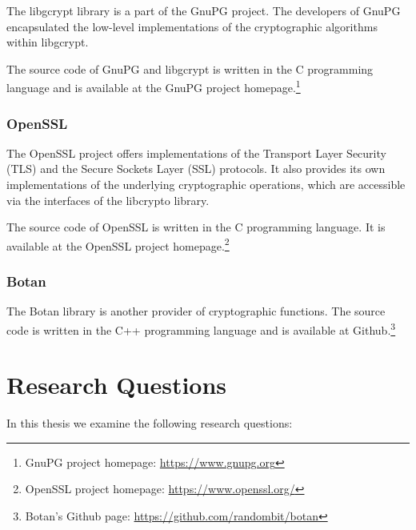 The libgcrypt library is a part of the GnuPG project.
The developers of GnuPG encapsulated the low-level implementations of the cryptographic algorithms within libgcrypt.

The source code of GnuPG and libgcrypt is written in the C programming language and is available at the GnuPG project homepage.\footnote{GnuPG project homepage: \url{https://www.gnupg.org}}

  \subsubsection{OpenSSL}

The OpenSSL project offers implementations of the Transport Layer Security (TLS) and the Secure Sockets Layer (SSL) protocols.
It also provides its own implementations of the underlying cryptographic operations, which are accessible via the interfaces of the libcrypto library.

The source code of OpenSSL is written in the C programming language.
It is available at the OpenSSL project homepage.\footnote{OpenSSL project homepage: \url{https://www.openssl.org/}}

  \subsubsection{Botan}

The Botan library is another provider of cryptographic functions.
The source code is written in the C++ programming language and is available at Github.\footnote{Botan's Github page: \url{https://github.com/randombit/botan}}


\section{Research Questions}
\label{researchq}

In this thesis we examine the following research questions:



